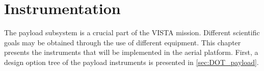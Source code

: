 \chapter{Instrumentation}
\label{chap:payload}

The payload subsystem is a crucial part of the VISTA mission. Different scientific goals may be obtained through the use of different equipment. This chapter presents the instruments that will be implemented in the aerial platform. First, a design option tree of the payload instruments is presented in \autoref{sec:DOT_payload}. 










